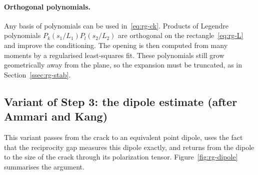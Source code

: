 \paragraph{Orthogonal polynomials.} Any basis of polynomials can be used in~\eqref{eq:rg-ck}. Products of Legendre polynomials $P_k(s_1/L_1)P_l(s_2/L_2)$ are orthogonal on the rectangle~\eqref{eq:rg-L} and improve the conditioning. The opening is then computed from many moments by a regularised least-squares fit. These polynomials still grow geometrically away from the plane, so the expansion must be truncated, as in Section~\ref{ssec:rg-stab}.

\subsection{Variant of Step 3: the dipole estimate (after Ammari and Kang)}\label{ssec:rg-ak}
%
This variant passes from the crack to an equivalent point dipole, uses the fact that the reciprocity gap measures this dipole exactly, and returns from the dipole to the size of the crack through its polarization tensor. Figure~\ref{fig:rg-dipole} summarises the argument.

